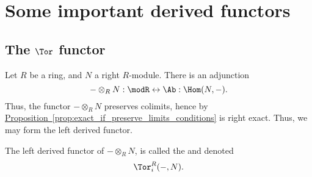 \documentclass[main.tex]{subfiles}
\begin{document}
\chapter{Some important derived functors}
\label{ch:some_important_derived_functors}

\section{The \texorpdfstring{$\Tor$}{Tor} functor}
\label{sec:tor}

Let $R$ be a ring, and $N$ a right $R$-module. There is an adjunction
\begin{equation*}
  - \otimes_{R} N : \modR \leftrightarrow \Ab : \Hom(N, -).
\end{equation*}
Thus, the functor $- \otimes_{R} N$ preserves colimits, hence by \hyperref[prop:exact_if_preserve_limits_conditions]{Proposition~\ref*{prop:exact_if_preserve_limits_conditions}} is right exact. Thus, we may form the left derived functor.

\begin{definition}
  \label{def:tor_functor}
  The left derived functor of $- \otimes_{R} N$, is called the  and denoted
  \begin{equation*}
    \Tor_{i}^{R}(-, N).
  \end{equation*}
\end{definition}
\end{document}
